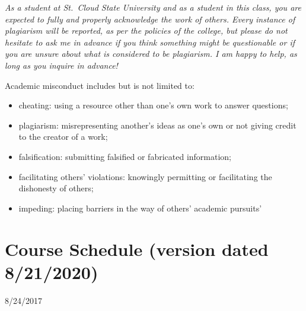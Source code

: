 \documentclass{tufte-handout}
\begin{document}
\begin{fullwidth}

\emph{As a student at St.~Cloud State University and as a student in this class, you are expected to fully and properly acknowledge the work of others. Every instance of plagiarism will be reported, as per the policies of the college, but please do not hesitate to ask me in advance if you think something might be questionable or if you are unsure about what is considered to be plagiarism. I am happy to help, as long as you inquire in advance! }

Academic misconduct includes but is not limited to:

\begin{itemize}
	\item cheating: using a resource other than one's own work to answer questions;
	\item plagiarism: misrepresenting another's ideas as one's own or not giving credit to the creator of a work;
	\item falsification: submitting falsified or fabricated information;
	\item facilitating others' violations: knowingly permitting or facilitating the dishonesty of others;
	\item impeding: placing barriers in the way of others' academic pursuits'
\end{itemize}



\newpage 

\section{Course Schedule (version dated 8/21/2020)}



  \setlength{\calwidth}{6.5in}
  \setlength{\calboxdepth}{0.3in}
  \begin{calendar}{8/24/20}{17}

  \calday[Monday]{\classday} %
  \calday[Tuesday]{\classday} %
  \skipday\skipday\skipday     
  \skipday\skipday %







\end{calendar}
\end{fullwidth}
\end{document}
